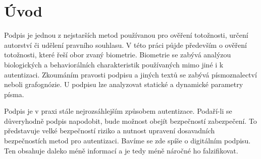 
%

\chapter{Úvod}
Podpis je jednou z nejstarších metod používanou pro ověření totožnosti, určení autorství či udělení pravního souhlasu.
V této práci půjde především o ověření totožnosti, které řeší obor zvaný biometrie.
Biometrie se zabývá analýzou biologických a behaviorálních charakteristik používaných mimo jiné i k autentizaci. 
Zkoumáním pravosti podpisu a jiných textů se zabývá písmoznalectví neboli grafognózie.
U podpisu lze analyzovat statické a dynamické parametry písma. 

Podpis je v praxi stále nejrozsáhlejším způsobem autentizace. 
Podaří-li se důveryhodně podpis napodobit, bude možnost obejít bezpečností zabezpečení. 
To představuje velké bezpečností riziko a nutnost upravení dosavadních bezpečnostích metod pro autentizaci. 
Bavíme se zde spíše o digitálním podpisu. Ten obsahuje daleko méně informací a je tedy méně náročné ho falzifikovat.


